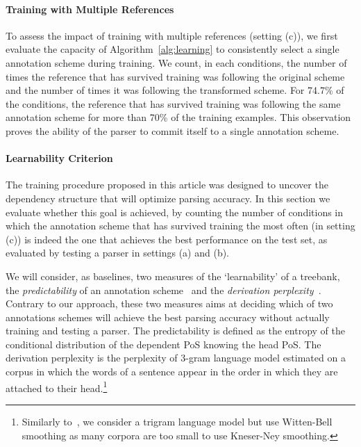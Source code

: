 \documentclass[11pt,letterpaper]{article}
\begin{document}

\paragraph*{Training with Multiple References}
To assess the impact of training with multiple references (setting
(c)), we first evaluate the capacity of Algorithm~\ref{alg:learning}
to consistently select a single annotation scheme during training. We
count, in each conditions, the number of times the reference that has
survived training was following the original scheme and the number of
times it was following the transformed scheme. For 74.7\% of the
conditions, the reference that has survived training was following the
same annotation scheme for more than 70\% of the training examples. This
observation proves the ability of the parser to commit itself to a
single annotation scheme.

\paragraph*{Learnability Criterion} The training procedure proposed in
this article was designed to uncover the dependency structure that will
optimize parsing accuracy. In this section we evaluate whether this goal is achieved, 
by counting the number of conditions in which the
annotation scheme that has survived training the most often (in
setting (c)) is indeed the one that achieves the best performance on
the test set, as evaluated by testing a parser in settings (a) and
(b).

We will consider, as baselines, two measures of the `learnability' of
a treebank, the \emph{predictability} of an annotation
scheme~\cite{schwartz12learnability} and the \emph{derivation
  perplexity}~\cite{sogaard10derivation}. Contrary to our
approach, these two measures aims at deciding which of two annotations
schemes will achieve the best parsing accuracy without actually
training and testing a parser.  The predictability is defined as the
entropy of the conditional distribution of the dependent PoS 
knowing the head PoS.  The derivation perplexity is the
perplexity of 3-gram language model estimated on a corpus in which the
words of a sentence appear in the order in which they are attached to
their head.\footnote{Similarly to~\cite{sogaard10derivation}, we
  consider a trigram language model but use Witten-Bell smoothing as
  many corpora are too small to use Kneser-Ney smoothing.}
\end{document}
